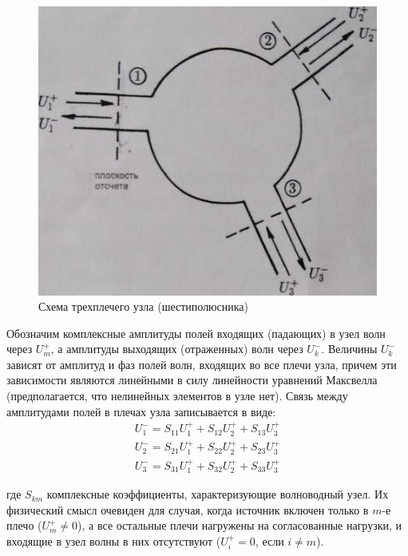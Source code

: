 ﻿\documentclass[a4paper,11pt]{article}
\begin{document}
\begin{figure}[h!]
	\centering
	\includegraphics{img/1.jpg}
	\caption{Схема трехплечего узла (шестиполюсника)}
	\label{fig:figure1}
\end{figure}

Обозначим комплексные амплитуды полей входящих (падающих) в узел волн через $U_m^+$, а амплитуды выходящих (отраженных) волн через $U_k^-$. 
Величины $U_k^-$ зависят от амплитуд и фаз полей волн, входящих во все плечи узла, причем эти зависимости являются линейными в силу линейности уравнений Максвелла (предполагается, что нелинейных элементов в узле нет). 
Связь между амплитудами полей в плечах узла записывается в виде:
\begin{equation}
	\begin{array} { l } { U _ { 1 } ^ { - } = S _ { 11 } U _ { 1 } ^ { + } + S _ { 12 } U _ { 2 } ^ { + } + S _ { 13 } U _ { 3 } ^ { + } } \\ { U _ { 2 } ^ { - } = S _ { 21 } U _ { 1 } ^ { + } + S _ { 22 } U _ { 2 } ^ { + } + S _ { 23 } U _ { 3 } ^ { + } } \\ { U _ { 3 } ^ { - } = S _ { 31 } U _ { 1 } ^ { + } + S _ { 32 } U _ { 2 } ^ { + } + S _ { 33 } U _ { 3 } ^ { + } } \end{array}
\end{equation}

где $S_{km}$ комплексные коэффициенты, характеризующие волноводный узел. 
Их физический смысл очевиден для случая, когда источник включен только в $m$-е плечо ($U_m^+\ne0$), а все остальные плечи нагружены на согласованные нагрузки, и входящие в узел волны в них отсутствуют ($U_i^+=0$, если $i\ne m$). 
\end{document}
